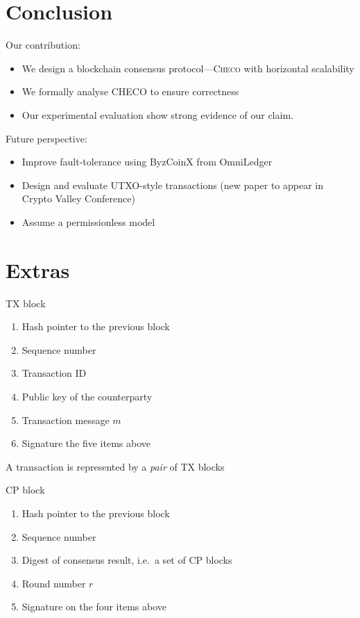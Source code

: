 \documentclass{beamer}
\begin{document}
\section{Conclusion}
\begin{frame}{\secname}
    Our contribution:
  \begin{itemize}
      \item We design a blockchain consensus protocol---\textsc{Checo} with horizontal scalability
      \item We formally analyse CHECO to ensure correctness
      \item Our experimental evaluation show strong evidence of our claim.
  \end{itemize}
      Future perspective:
  \begin{itemize}
      \item Improve fault-tolerance using ByzCoinX from OmniLedger
      \item Design and evaluate UTXO-style transactions (new paper to appear in Crypto Valley Conference)
      \item Assume a permissionless model
  \end{itemize}
\end{frame}


\section*{Extras}
\begin{frame}[noframenumbering]{TX block}
  \begin{enumerate}
    \item Hash pointer to the previous block
    \item Sequence number
    \item Transaction ID
    \item Public key of the counterparty
    \item Transaction message $m$
    \item Signature the five items above
  \end{enumerate}
  \vfill
  A transaction is represented by a \emph{pair} of TX blocks
\end{frame}

\begin{frame}[noframenumbering]{CP block}
  \begin{enumerate}
    \item Hash pointer to the previous block
    \item Sequence number
    \item Digest of consensus result, i.e.~a set of CP blocks
    \item Round number $r$
    \item Signature on the four items above
  \end{enumerate}
\end{frame}
\end{document}
